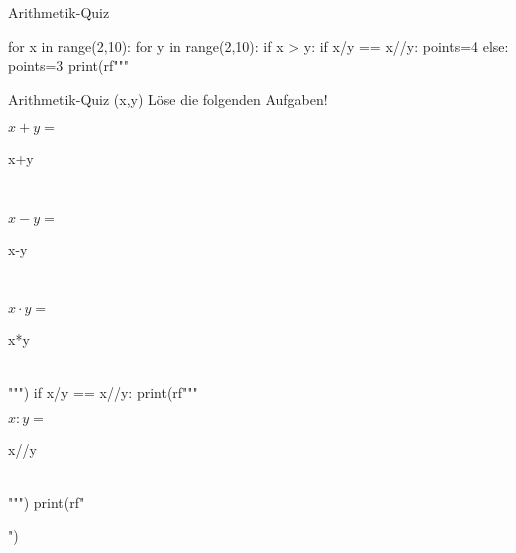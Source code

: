 \documentclass[ngerman,a4paper,10pt]{article}
\begin{document}
\begin{quiz}{Arithmetik-Quiz}
\begin{python}
for x in range(2,10):
  for y in range(2,10):
    if x > y:
      if x/y == x//y:
        points=4
      else:
        points=3  
      print(rf"""\begin{{cloze}}[points={points}]{{Arithmetik-Quiz {(x,y)}}}
      L\"ose die folgenden Aufgaben!\\
      \begin{{numerical}}
      ${x} + {y} =$
      \item {x+y} 
      \end{{numerical}}\\
      \begin{{numerical}}
      ${x} - {y} =$
      \item {x-y} 
      \end{{numerical}}\\
      \begin{{numerical}}
      ${x} \cdot {y} =$
      \item {x*y} 
      \end{{numerical}}\\""")
      if x/y == x//y:
        print(rf"""\begin{{numerical}}
        ${x} : {y} =$
        \item {x//y} 
        \end{{numerical}}\\""")
      print(rf"\end{{cloze}}")
\end{python}	
\end{quiz}
\end{document}
